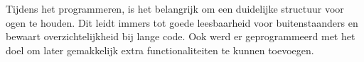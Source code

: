 \\
\\
Tijdens het programmeren, is het belangrijk om een duidelijke structuur voor ogen te houden. Dit leidt immers tot goede leesbaarheid voor buitenstaanders en bewaart overzichtelijkheid bij lange code. Ook werd er geprogrammeerd met het doel om later gemakkelijk extra functionaliteiten te kunnen toevoegen.
